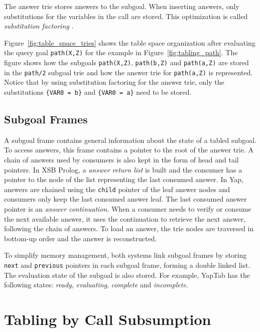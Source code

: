 The answer trie stores answers to the subgoal. When inserting answers, only substitutions
for the variables in the call are stored. This optimization is called \textit{substitution factoring} \cite{RamakrishnanIV-95}.

Figure~\ref{fig:table_space_tries} shows the table space organization after evaluating the query goal
\texttt{path(X,Z)} for the example in Figure~\ref{fig:tabling_path}.
The figure shows how the subgoals \texttt{path(X,Z)}, \texttt{path(b,Z)} and \texttt{path(a,Z)} are
stored in the \texttt{path/2} subgoal trie and how the answer trie for \texttt{path(a,Z)} is represented.
Notice that by using substitution factoring for the answer trie, only the substitutions
\texttt{\{VAR0~=~b\}} and \texttt{\{VAR0~=~a\}} need to be stored.

\subsection{Subgoal Frames}

A subgoal frame contains general information about the state of a tabled subgoal. To access answers, this
frame contains a pointer to the root of the answer trie. A chain of answers used by consumers is also kept
in the form of head and tail pointers. In XSB Prolog, a \textit{answer return list} is built and the consumer has
a pointer to the node of the list representing the last consumed answer. In Yap, answers are chained using
the \texttt{child} pointer of the leaf answer nodes and consumers only keep the last consumed answer leaf.
The last consumed answer pointer is an \textit{answer continuation}. When a consumer needs to verify
or consume the next available answer, it uses the continuation to retrieve the next answer, following the
chain of answers. To load an answer, the trie nodes are traversed in bottom-up order and the answer is
reconstructed.

To simplify memory management, both systems link subgoal frames by storing
\texttt{next} and \texttt{previous} pointers in each subgoal frame, forming a double linked list.
The evaluation state of the subgoal is also stored. For example, YapTab has the following states:
\textit{ready}, \textit{evaluating}, \textit{complete} and \textit{incomplete}.

\section{Tabling by Call Subsumption} \label{sec:subsumption}

